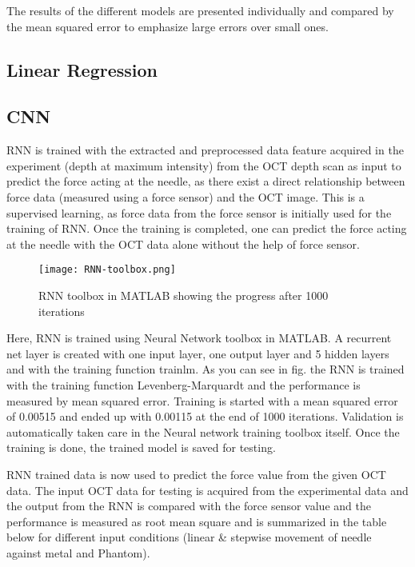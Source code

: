 
The results of the different models are presented individually and compared by the mean squared error to emphasize 
large errors over small ones.

\subsection{Linear Regression}
\subsection{CNN}
      RNN is trained with the extracted and preprocessed data feature acquired in the experiment (depth at maximum intensity) from the OCT depth scan as input to predict the force acting at the needle, as there exist a direct relationship between force data (measured using a force sensor) and the OCT image. This is a supervised learning, as force data from the force sensor is initially used for the training of RNN. Once the training is completed, one can predict the force acting at the needle with the OCT data alone without the help of force sensor.
      \begin{figure}
    \centering
    \texttt{[image: RNN-toolbox.png]}
    \caption{RNN toolbox in MATLAB showing the progress after 1000 iterations}
    \label{fig:RNN toolbox}
\end{figure}
      
      Here, RNN is trained using Neural Network toolbox in MATLAB. A recurrent net layer is created with one input layer, one output layer and 5 hidden layers and with the training function trainlm. As you can see in fig. the RNN is trained with the training function Levenberg-Marquardt and the performance is measured by mean squared error. Training is started with a mean squared error of 0.00515 and ended up with 0.00115 at the end of 1000 iterations. Validation is automatically taken care in the Neural network training toolbox itself. Once the training is done, the trained model is saved for testing. 
      
      RNN trained data is now used to predict the force value from the given OCT data. The input OCT data for testing is acquired from the experimental data and the output from the RNN is compared with the force sensor value and the performance is measured as root mean square and is summarized in the table below for different input conditions (linear & stepwise movement of needle against metal and Phantom). 
    
